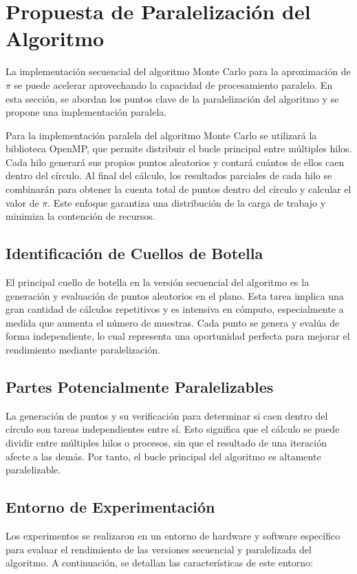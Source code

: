 \documentclass[a4paper, 10pt]{IEEEtran}
\begin{document}
\section{Propuesta de Paralelización del Algoritmo}
La implementación secuencial del algoritmo Monte Carlo para la aproximación de $\pi$ se puede acelerar aprovechando la capacidad de procesamiento paralelo. En esta sección, se abordan los puntos clave de la paralelización del algoritmo y se propone una implementación paralela.

Para la implementación paralela del algoritmo Monte Carlo se utilizará la biblioteca OpenMP, que permite distribuir el bucle principal entre múltiples hilos. Cada hilo generará sus propios puntos aleatorios y contará cuántos de ellos caen dentro del círculo. Al final del cálculo, los resultados parciales de cada hilo se combinarán para obtener la cuenta total de puntos dentro del círculo y calcular el valor de $\pi$. Este enfoque garantiza una distribución de la carga de trabajo y minimiza la contención de recursos.

\subsection{Identificación de Cuellos de Botella}
El principal cuello de botella en la versión secuencial del algoritmo es la generación y evaluación de puntos aleatorios en el plano. Esta tarea implica una gran cantidad de cálculos repetitivos y es intensiva en cómputo, especialmente a medida que aumenta el número de muestras. Cada punto se genera y evalúa de forma independiente, lo cual representa una oportunidad perfecta para mejorar el rendimiento mediante paralelización.

\subsection{Partes Potencialmente Paralelizables}
La generación de puntos y su verificación para determinar si caen dentro del círculo son tareas independientes entre sí. Esto significa que el cálculo se puede dividir entre múltiples hilos o procesos, sin que el resultado de una iteración afecte a las demás. Por tanto, el bucle principal del algoritmo es altamente paralelizable.


\subsection{Entorno de Experimentación}
Los experimentos se realizaron en un entorno de hardware y software específico para evaluar el rendimiento de las versiones secuencial y paralelizada del algoritmo. A continuación, se detallan las características de este entorno:
\end{document}
